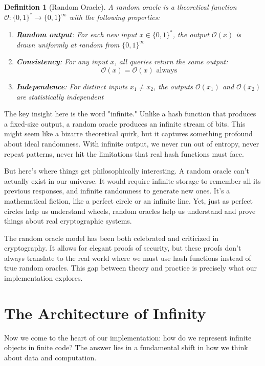 \documentclass[11pt]{article}
\newtheorem{definition}{Definition}
\begin{document}
\begin{definition}[Random Oracle]
A random oracle is a theoretical function $\mathcal{O}: \{0,1\}^* \to \{0,1\}^\infty$ with the following properties:
\begin{enumerate}
\item \textbf{Random output}: For each new input $x \in \{0,1\}^*$, the output $\mathcal{O}(x)$ is drawn uniformly at random from $\{0,1\}^\infty$
\item \textbf{Consistency}: For any input $x$, all queries return the same output:
$$\mathcal{O}(x) = \mathcal{O}(x) \text{ always}$$
\item \textbf{Independence}: For distinct inputs $x_1 \neq x_2$, the outputs $\mathcal{O}(x_1)$ and $\mathcal{O}(x_2)$ are statistically independent
\end{enumerate}
\end{definition}

The key insight here is the word "infinite." Unlike a hash function that produces a fixed-size output, a random oracle produces an infinite stream of bits. This might seem like a bizarre theoretical quirk, but it captures something profound about ideal randomness. With infinite output, we never run out of entropy, never repeat patterns, never hit the limitations that real hash functions must face.

But here's where things get philosophically interesting. A random oracle can't actually exist in our universe. It would require infinite storage to remember all its previous responses, and infinite randomness to generate new ones. It's a mathematical fiction, like a perfect circle or an infinite line. Yet, just as perfect circles help us understand wheels, random oracles help us understand and prove things about real cryptographic systems.

The random oracle model has been both celebrated and criticized in cryptography. It allows for elegant proofs of security, but these proofs don't always translate to the real world where we must use hash functions instead of true random oracles. This gap between theory and practice is precisely what our implementation explores.

\section{The Architecture of Infinity}

Now we come to the heart of our implementation: how do we represent infinite objects in finite code? The answer lies in a fundamental shift in how we think about data and computation.
\end{document}

